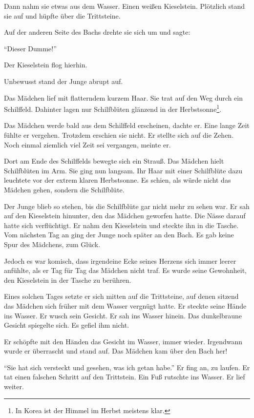 \documentclass[prd,a4paper,12pt,tightenlines,notitlepage,nofootinbib]{revtex4-1}
\begin{document}
Dann nahm sie etwas aus dem Wasser.
Einen weißen Kieselstein.  Plötzlich stand sie auf und hüpfte über die
Trittsteine.

Auf der anderen Seite des Bachs drehte sie sich um und
sagte:

"`Dieser Dumme!"'

Der Kieselstein flog hierhin.

Unbewusst stand der Junge abrupt auf.

Das Mädchen lief mit flatterndem kurzem
Haar.  Sie trat auf den Weg durch ein Schilffeld.  Dahinter lagen nur
Schilfblüten glänzend in der Herbstsonne\footnote{In Korea ist
der Himmel im Herbst meistens klar.}.

Das Mädchen werde bald aus dem
Schilffeld erscheinen, dachte er.  Eine lange Zeit fühlte er vergehen.
Trotzdem erschien sie nicht.  Er stellte sich auf die Zehen.  Noch einmal
ziemlich viel Zeit sei vergangen, meinte er.

Dort am Ende des
Schilffelds bewegte sich ein Strauß.  Das Mädchen hielt Schilfblüten
im Arm.  Sie ging nun langsam.  Ihr Haar mit einer Schilfblüte dazu
leuchtete vor der extrem klaren Herbstsonne.  Es schien, als würde
nicht das Mädchen gehen, sondern die Schilfblüte.

Der Junge blieb
so stehen, bis die Schilfblüte gar nicht mehr zu sehen war.  Er sah
auf den Kieselstein hinunter, den das Mädchen geworfen hatte.  Die Nässe darauf
hatte sich verflüchtigt.  Er nahm den Kieselstein und steckte ihn in die
Tasche.
\\

Vom nächsten Tag an ging der Junge noch später an den Bach.  Es gab
keine Spur %
des Mädchens, zum Glück.

Jedoch es war komisch, dass
irgendeine Ecke seines Herzens sich immer leerer anfühlte, als er Tag für
Tag das Mädchen nicht traf.  Es wurde seine Gewohnheit, den
Kieselstein in der Tasche zu berühren.

Eines solchen Tages setzte er
sich mitten auf die Trittsteine, auf denen sitzend das Mädchen sich früher mit
dem Wasser vergnügt hatte.  Er steckte seine Hände ins Wasser.
Er wusch sein Gesicht.  Er sah ins Wasser hinein.  Das dunkelbraune
Gesicht spiegelte sich.  Es gefiel ihm nicht.

Er schöpfte mit den
Händen das Gesicht im Wasser, immer wieder.  Irgendwann wurde er
überrascht und stand auf.  Das Mädchen kam über den Bach her!

"`Sie hat sich versteckt und gesehen, was ich getan habe."'
Er fing an,
zu laufen.  Er tat einen falschen Schritt auf den Trittstein.  Ein
Fuß rutschte ins Wasser.  Er lief weiter.
\end{document}
